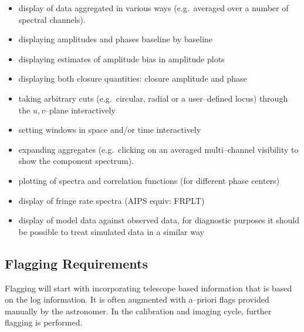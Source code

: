 \begin{itemize}

\item display of data aggregated in various ways (e.g.\ averaged over
  a number of spectral channels). 
  
\item displaying amplitudes and phases baseline by baseline

\item displaying estimates of amplitude bias in amplitude plots

\item displaying both closure quantities: closure amplitude and phase
  
\item taking arbitrary cuts (e.g.\ circular, radial or a user--defined
  locus) through the $u,\! v$--plane interactively

\item setting windows in space and\slash or time interactively
  
\item expanding aggregates (e.g.\ clicking on an averaged
  multi--channel visibility to show the component spectrum).

\item plotting of spectra and correlation functions 
   (for different phase centers)

\item display of fringe rate spectra (AIPS equiv: FRPLT)
  
\item display of model data against observed data, for diagnostic
  purposes it should be possible to treat simulated data in a similar way

\end{itemize}

\subsection{Flagging Requirements}

Flagging will start with incorporating telescope based information
that is based on the log information. It is often augmented with
a--priori flags provided manually by the astronomer. In the calibration 
and imaging cycle, further flagging is performed.

